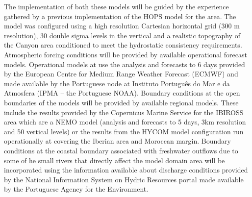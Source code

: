 The implementation of both these models will be guided by the
experience gathered by a previous implementation of the HOPS model for
the \naz area. The model was configured using a high resolution
Cartesian horizontal grid (300 m resolution), 30 double sigma levels
in the vertical and a realistic topography of the \naz Canyon area
conditioned to meet the hydrostatic consistency requirements.
Atmospheric forcing conditions will be provided by available
operational forecast models. Operational models at \inst use the
analysis and forecasts to 6 days provided by the European Centre for
Medium Range Weather Forecast (ECMWF) and made available by the
Portuguese node at Instituto Portugu\^{e}s do Mar e da Atmosfera (IPMA
-- the Portuguese NOAA).  Boundary conditions at the open boundaries
of the models will be provided by available regional models. These
include the results provided by the Copernicus Marine Service for the
IBIROSS area which are a NEMO model (analysis and forecasts to 5 days,
3km resolution and 50 vertical levels) or the results from the HYCOM
model configuration run operationally at \inst covering the Iberian
area and Moroccan margin.  Boundary conditions at the coastal boundary
associated with freshwater outflows due to some of he small rivers
that directly affect the model domain area will be incorporated using
the information available about discharge conditions provided by the
National Information System on Hydric Resources portal made available
by the Portuguese Agency for the Environment.


